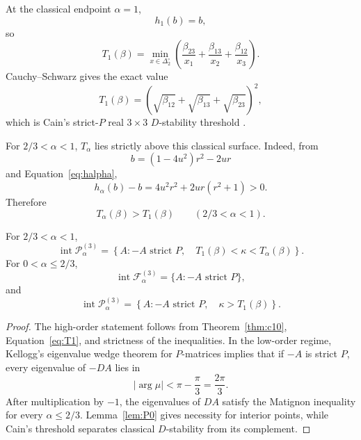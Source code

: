 At the classical endpoint \(\alpha=1\),
\[
h_1(b)=b,
\]
so
\begin{equation}
T_1(\beta)
=
\min_{x\in\Delta_2^\circ}
\left(
\frac{\beta_{23}}{x_1}
+
\frac{\beta_{13}}{x_2}
+
\frac{\beta_{12}}{x_3}
\right).
\end{equation}
Cauchy--Schwarz gives the exact value
\begin{equation}
\boxed{
T_1(\beta)
=
\left(
\sqrt{\beta_{12}}+
\sqrt{\beta_{13}}+
\sqrt{\beta_{23}}
\right)^2,
}
\label{eq:T1}
\end{equation}
which is Cain's strict-\(P\) real \(3\times3\) \(D\)-stability threshold \cite{Cain1976}.

For \(2/3<\alpha<1\), \(T_\alpha\) lies strictly above this classical surface. Indeed, from
\[
b=(1-4u^2)r^2-2ur
\]
and Equation~\eqref{eq:halpha},
\[
h_\alpha(b)-b
=
4u^2r^2+2ur(r^2+1)>0.
\]
Therefore
\begin{equation}
\boxed{
T_\alpha(\beta)>T_1(\beta)
\qquad(2/3<\alpha<1).
}
\label{eq:strict-gap}
\end{equation}

\begin{Corollary}\label{cor:fracband}
For \(2/3<\alpha<1\),
\begin{equation}
\operatorname{int}\mathcal P_\alpha^{(3)}
=
\left\{
A:
-A\text{ strict }P,\quad
T_1(\beta)<\kappa<T_\alpha(\beta)
\right\}.
\label{eq:fractional-band}
\end{equation}
For \(0<\alpha\le2/3\),
\begin{equation}
\operatorname{int}\mathcal F_\alpha^{(3)}
=
\{A:-A\text{ strict }P\},
\label{eq:low-order-F}
\end{equation}
and
\begin{equation}
\operatorname{int}\mathcal P_\alpha^{(3)}
=
\left\{
A:
-A\text{ strict }P,\quad
\kappa>T_1(\beta)
\right\}.
\label{eq:low-order-P}
\end{equation}
\end{Corollary}

\begin{proof}
The high-order statement follows from Theorem~\ref{thm:c10}, Equation~\eqref{eq:T1}, and strictness of the inequalities. In the low-order regime, Kellogg's eigenvalue wedge theorem for \(P\)-matrices \cite{Kellogg1972} implies that if \(-A\) is strict \(P\), every eigenvalue of \(-DA\) lies in
\[
|\arg\mu|<\pi-\frac{\pi}{3}=\frac{2\pi}{3}.
\]
After multiplication by \(-1\), the eigenvalues of \(DA\) satisfy the Matignon inequality for every \(\alpha\le2/3\). Lemma~\ref{lem:P0} gives necessity for interior points, while Cain's threshold separates classical \(D\)-stability from its complement.
\end{proof}

